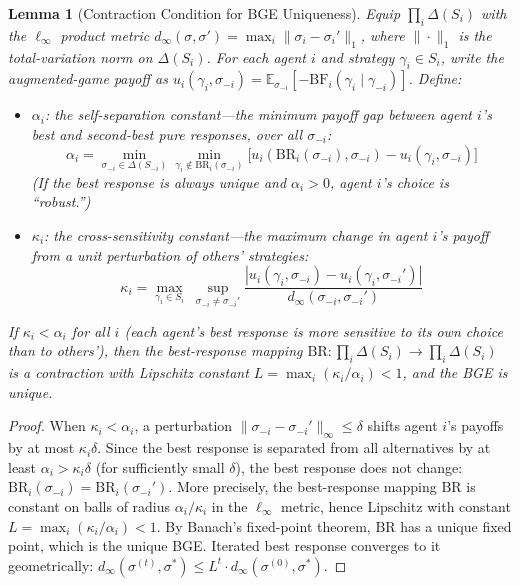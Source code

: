 \documentclass[12pt]{article}
\newtheorem{lemma}[theorem]{Lemma}
\theoremstyle{definition}
\theoremstyle{remark}
\newcommand{\BF}{\mathrm{BF}}              %
\begin{document}
\begin{lemma}[Contraction Condition for BGE Uniqueness]
\label{lem:contraction}
Equip $\prod_i \Delta(S_i)$ with the $\ell_\infty$ product metric $d_\infty(\sigma, \sigma') = \max_i \|\sigma_i - \sigma_i'\|_1$, where $\|\cdot\|_1$ is the total-variation norm on $\Delta(S_i)$.  For each agent $i$ and strategy $\gamma_i \in S_i$, write the augmented-game payoff as $u_i(\gamma_i, \sigma_{-i}) = \mathbb{E}_{\sigma_{-i}}[-\BF_i(\gamma_i \mid \gamma_{-i})]$.  Define:
\begin{itemize}
    \item $\alpha_i$: the \emph{self-separation constant}---the minimum payoff gap between agent $i$'s best and second-best pure responses, over all $\sigma_{-i}$:
    \[
    \alpha_i = \min_{\sigma_{-i} \in \Delta(S_{-i})} \min_{\gamma_i \notin \mathrm{BR}_i(\sigma_{-i})} \bigl[u_i(\mathrm{BR}_i(\sigma_{-i}), \sigma_{-i}) - u_i(\gamma_i, \sigma_{-i})\bigr]
    \]
    (If the best response is always unique and $\alpha_i > 0$, agent $i$'s choice is ``robust.'')
    \item $\kappa_i$: the \emph{cross-sensitivity constant}---the maximum change in agent $i$'s payoff from a unit perturbation of others' strategies:
    \[
    \kappa_i = \max_{\gamma_i \in S_i}\; \sup_{\sigma_{-i} \neq \sigma_{-i}'} \frac{|u_i(\gamma_i, \sigma_{-i}) - u_i(\gamma_i, \sigma_{-i}')|}{d_\infty(\sigma_{-i}, \sigma_{-i}')}
    \]
\end{itemize}
If $\kappa_i < \alpha_i$ for all $i$ (each agent's best response is more sensitive to its own choice than to others'), then the best-response mapping $\mathrm{BR}: \prod_i \Delta(S_i) \to \prod_i \Delta(S_i)$ is a contraction with Lipschitz constant $L = \max_i (\kappa_i / \alpha_i) < 1$, and the BGE is unique.
\end{lemma}

\begin{proof}
When $\kappa_i < \alpha_i$, a perturbation $\|\sigma_{-i} - \sigma_{-i}'\|_\infty \leq \delta$ shifts agent $i$'s payoffs by at most $\kappa_i \delta$.  Since the best response is separated from all alternatives by at least $\alpha_i > \kappa_i \delta$ (for sufficiently small $\delta$), the best response does not change: $\mathrm{BR}_i(\sigma_{-i}) = \mathrm{BR}_i(\sigma_{-i}')$.  More precisely, the best-response mapping $\mathrm{BR}$ is constant on balls of radius $\alpha_i / \kappa_i$ in the $\ell_\infty$ metric, hence Lipschitz with constant $L = \max_i (\kappa_i/\alpha_i) < 1$.  By Banach's fixed-point theorem, $\mathrm{BR}$ has a unique fixed point, which is the unique BGE.  Iterated best response converges to it geometrically: $d_\infty(\sigma^{(t)}, \sigma^*) \leq L^t \cdot d_\infty(\sigma^{(0)}, \sigma^*)$.
\end{proof}
\end{document}
